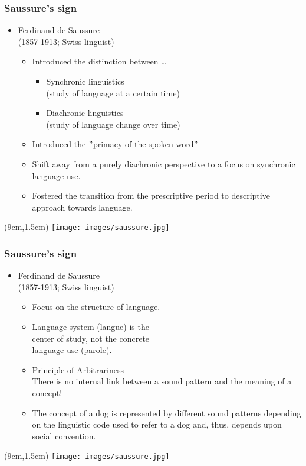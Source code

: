 \documentclass[12pt, table]{beamer}
\begin{document}
\begin{frame}
\frametitle{Saussure's sign}
\begin{itemize} 
\item Ferdinand de Saussure \\ (1857-1913; Swiss linguist)
\begin{itemize}
\item Introduced the distinction between \dots
\begin{itemize}
\item Synchronic linguistics \\ (study of language at a certain time)
\item Diachronic linguistics \\(study of language change over time)
\end{itemize}
\item Introduced the $"$primacy of the spoken word$"$ 
\item Shift away from a purely diachronic perspective to a focus on synchronic language use.
\item Fostered the transition from the prescriptive period to descriptive approach towards language.
\end{itemize}
\end{itemize}
\begin{textblock*}{8cm}(9cm,1.5cm)
\texttt{[image: images/saussure.jpg]}
\end{textblock*}
\end{frame}

\begin{frame}
\frametitle{Saussure's sign}
\begin{itemize} 
\item Ferdinand de Saussure \\ (1857-1913; Swiss linguist)
\begin{itemize}
\item Focus on the structure of language. 
\item Language system (langue) is the \\ center of study, not the concrete \\ language use (parole).
\item Principle of Arbitrariness\\[.2cm]
There is no internal link between a sound pattern and the meaning of a concept!\\[.2cm]
\item The concept of a dog is represented by different sound patterns depending on the linguistic code used to refer to a dog and, thus, depends upon social convention.
\end{itemize}
\end{itemize}
\begin{textblock*}{8cm}(9cm,1.5cm)
\texttt{[image: images/saussure.jpg]}
\end{textblock*}
\end{frame}
\end{document}
